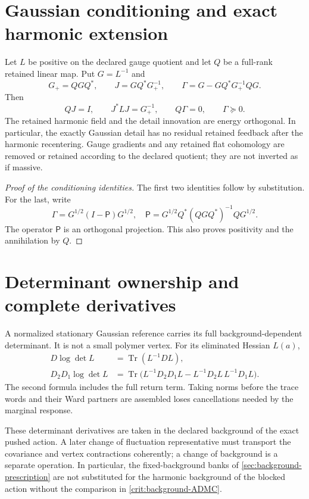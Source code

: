 \documentclass[11pt,oneside,openany]{book}
\theoremstyle{definition}
\theoremstyle{remark}
\newcommand{\Tr}{\operatorname{Tr}}
\begin{document}
\section{Gaussian conditioning and exact harmonic extension}
Let $L$ be positive on the declared gauge quotient and let $Q$ be a full-rank retained linear map. Put $G=L^{-1}$ and
\begin{equation}\label{eq:gauss-conditional}
G_+=QGQ^*,\qquad J=GQ^*G_+^{-1},\qquad
\Gamma=G-GQ^*G_+^{-1}QG.
\end{equation}
Then
\begin{equation}\label{eq:harmonic}
QJ=I,\qquad J^*LJ=G_+^{-1},\qquad Q\Gamma=0,\qquad\Gamma\succeq0.
\end{equation}
The retained harmonic field and the detail innovation are energy orthogonal. In particular, the exactly Gaussian detail has no residual retained feedback after the harmonic recentering. Gauge gradients and any retained flat cohomology are removed or retained according to the declared quotient; they are not inverted as if massive.

\begin{proof}[Proof of the conditioning identities]
The first two identities follow by substitution. For the last, write
\[
\Gamma=G^{1/2}(I-\mathsf P)G^{1/2},\quad
\mathsf P=G^{1/2}Q^*(QGQ^*)^{-1}QG^{1/2}.
\]
The operator $\mathsf P$ is an orthogonal projection. This also proves positivity and the annihilation by $Q$.
\end{proof}

\section{Determinant ownership and complete derivatives}
A normalized stationary Gaussian reference carries its full background-dependent determinant. It is not a small polymer vertex. For its eliminated Hessian $L(a)$,
\begin{align}
D\log\det L&=\Tr(L^{-1}DL),\label{eq:detfirst}\\
D_2D_1\log\det L
&=\Tr\bigl(L^{-1}D_2D_1L-L^{-1}D_2L\,L^{-1}D_1L\bigr).
\label{eq:detsecond}
\end{align}
The second formula includes the full return term. Taking norms before the trace words and their Ward partners are assembled loses cancellations needed by the marginal response.

These determinant derivatives are taken in the declared background of the
exact pushed action. A later change of fluctuation representative must
transport the covariance and vertex contractions coherently; a change of
background is a separate operation. In particular, the fixed-background
banks of \cref{sec:background-prescription} are not substituted for the
harmonic background of the blocked action without the comparison in
\cref{crit:background-ADMC}.
\end{document}
